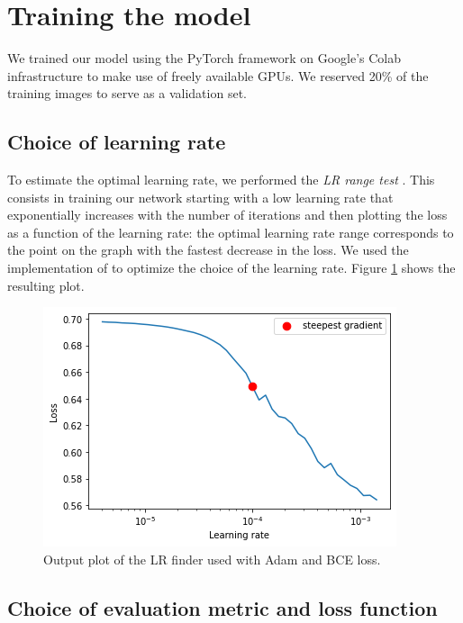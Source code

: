 \documentclass[10pt,conference,compsocconf]{IEEEtran}
\begin{document}
\section{Training the model}

We trained our model using the PyTorch framework \cite{pytorch} on Google's Colab infrastructure to make use of freely available GPUs. We reserved 20\% of the training images to serve as a validation set. 

\subsection{Choice of learning rate}
\label{sec:choice_lr}

To estimate the optimal learning rate, we performed the \emph{LR range test}  \cite{lr_estimation}. This consists in training our network starting with a low learning rate that exponentially increases with the number of iterations and then plotting the loss as a function of the learning rate: the optimal learning rate range corresponds to the point on the graph with the fastest decrease in the loss. We used the implementation of \cite{pytorch_lr_finder} to optimize the choice of the learning rate. Figure \ref{fig:lr_finder_plot} shows the resulting plot.

\begin{figure}[ht]
    \centering
    \includegraphics[width=0.7\linewidth]{doc/images/lr_finder_plot.png}
    \caption{Output plot of the LR finder used with Adam and BCE loss.}
    \label{fig:lr_finder_plot}
\end{figure}

\subsection{Choice of evaluation metric and loss function}
\end{document}
